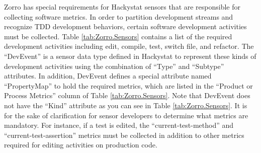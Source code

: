 Zorro has special requirements for Hackystat sensors that are 
responsible for collecting software metrics. In order to 
partition development streams and recognize TDD development 
behaviors, certain software development activities must be 
collected. Table \ref{tab:Zorro.Sensors} contains a list of the 
required development activities including edit, compile, test, 
switch file, and refactor. The ``DevEvent'' is 
a sensor data type defined in Hackystat to represent these 
kinds of development activities using the combination of ``Type'' 
and ``Subtype'' attributes. In addition, DevEvent defines a special 
attribute named ``PropertyMap'' to hold the required metrics, which 
are listed in the ``Product or Process Metrics'' column of 
Table \ref{tab:Zorro.Sensors}. Note that DevEvent does
not have the ``Kind'' attribute as you can see in 
Table \ref{tab:Zorro.Sensors}. It is for the sake of 
clarification for sensor developers to determine
what metrics are mandatory. For instance, if a test is
edited, the ``current-test-method'' and ``current-test-assertion'' 
metrics must be collected in addition to other metrics 
required for editing activities on production code. 

